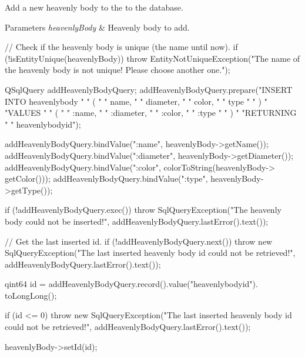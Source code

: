 \-Add a new heavenly body to the to the database. 


\begin{DoxyParams}{\-Parameters}
{\em heavenly\-Body} & \-Heavenly body to add. \\
\hline
\end{DoxyParams}

\begin{DoxyCode}
{
    // Check if the heavenly body is unique (the name until now).
    if (!isEntityUnique(heavenlyBody))
    {
        throw EntityNotUniqueException("The name of the heavenly body is not
       unique! Please choose another one.");
    }

    QSqlQuery addHeavenlyBodyQuery;
    addHeavenlyBodyQuery.prepare("INSERT INTO heavenlybody "
                                 "      ( "
                                 "       name, "
                                 "       diameter, "
                                 "       color, "
                                 "       type "
                                 "      ) "
                                 "VALUES "
                                 "      ( "
                                 "       :name, "
                                 "       :diameter, "
                                 "       :color, "
                                 "       :type "
                                 "      ) "
                                 "RETURNING "
                                 "      heavenlybodyid");

    addHeavenlyBodyQuery.bindValue(":name", heavenlyBody->getName());
    addHeavenlyBodyQuery.bindValue(":diameter", heavenlyBody->getDiameter());
    addHeavenlyBodyQuery.bindValue(":color", colorToString(heavenlyBody->
      getColor()));
    addHeavenlyBodyQuery.bindValue(":type", heavenlyBody->getType());

    if (!addHeavenlyBodyQuery.exec())
    {
        throw SqlQueryException("The heavenly body could not be inserted!",
                                addHeavenlyBodyQuery.lastError().text());
    }

    // Get the last inserted id.
    if (!addHeavenlyBodyQuery.next())
    {
        throw new SqlQueryException("The last inserted heavenly body id could
       not be retrieved!",
                                    addHeavenlyBodyQuery.lastError().text());
    }

    qint64 id = addHeavenlyBodyQuery.record().value("heavenlybodyid").
      toLongLong();

    if (id <= 0)
    {
        throw new SqlQueryException("The last inserted heavenly body id could
       not be retrieved!",
                                    addHeavenlyBodyQuery.lastError().text());
    }

    heavenlyBody->setId(id);
}
\end{DoxyCode}
